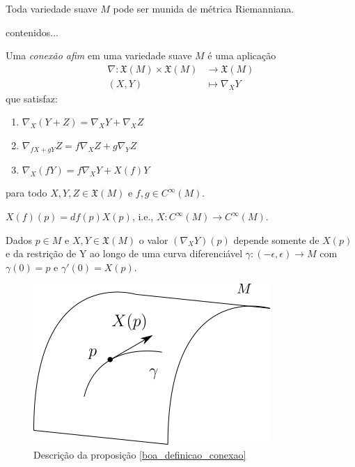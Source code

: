\begin{corolario}
	Toda variedade suave $M$ pode ser munida de métrica Riemanniana.
\end{corolario}

\begin{demonstracao}
	contenidos...
\end{demonstracao}

\begin{definicao}
	Uma \emph{conexão afim} em uma variedade suave $M$ é uma aplicação
	\begin{align*}
		\nabla: \mathfrak{X}(M) \times \mathfrak{X}(M) & \rightarrow \mathfrak{X}(M)\\
		(X,Y) & \mapsto \nabla_X Y
	\end{align*}	
	que satisfaz:
	\begin{enumerate}
		\item $\nabla_X (Y+Z) = \nabla_X Y + \nabla_X Z$
		\item $\nabla_{fX+gY} Z = f \nabla_X Z + g \nabla_Y Z $
		\item $\nabla_X (fY) = f \nabla_X Y + X(f) Y$
	\end{enumerate}
para todo $X,Y,Z \in \mathfrak{X}(M)$ e $f,g \in C^{\infty}(M)$.
\end{definicao}

\begin{observacao}
	$X(f)(p) = df(p)X(p)$, i.e., $X: C^{\infty}(M) \rightarrow C^{\infty}(M)$.
\end{observacao}

\begin{proposicao}\label{boa_definicao_conexao}
	Dados $p \in M$ e $X,Y \in \mathfrak{X}(M)$ o valor $(\nabla_X Y)(p)$ depende somente de $X(p)$ e da restrição de Y ao longo de uma curva diferenciável $\gamma: (-\epsilon, \epsilon) \rightarrow M$ com $\gamma(0)=p$ e $\gamma'(0)=X(p)$.
\end{proposicao}

\begin{figure}
	\centering
	\includegraphics[scale=0.5]{images/curva_variedade.png}
	\caption{Descrição da proposição \ref{boa_definicao_conexao}}
\end{figure}

